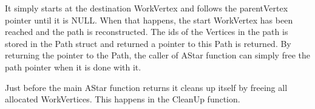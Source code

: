 It simply starts at the destination WorkVertex and follows the parentVertex pointer until it is NULL. When that happens, the start WorkVertex has been reached and the path is reconstructed. The ids of the Vertices in the path is stored in the Path struct and returned a pointer to this Path is returned. By returning the pointer to the Path, the caller of AStar function can simply free the path pointer when it is done with it.

Just before the main AStar function returns it cleans up itself by freeing all allocated WorkVertices. This happens in the CleanUp function.

